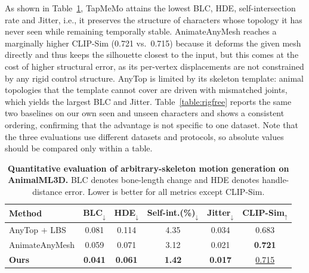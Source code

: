 \documentclass[lettersize,journal]{IEEEtran}
\newcommand{\blu}[1]{\texorpdfstring{{\leavevmode\color{blue}#1}}{#1}}
\begin{document}
\blu{As shown in Table~\ref{table:animalml3d}, TapMeMo attains the lowest BLC, HDE,
self-intersection rate and Jitter, i.e., it preserves the structure of characters whose
topology it has never seen while remaining temporally stable. AnimateAnyMesh reaches a
marginally higher CLIP-Sim (0.721 vs.\ 0.715) because it deforms the given mesh directly and
thus keeps the silhouette closest to the input, but this comes at the cost of higher
structural error, as its per-vertex displacements are not constrained by any rigid control
structure. AnyTop is limited by its skeleton template: animal topologies that the template
cannot cover are driven with mismatched joints, which yields the largest BLC and Jitter.
Table~\ref{table:rigfree} reports the same two baselines on our own seen and unseen
characters and shows a consistent ordering, confirming that the advantage is not specific to
one dataset. Note that the three evaluations use different datasets and protocols, so
absolute values should be compared only within a table.}
\begin{table}[t]
  \centering
  \setlength{\abovecaptionskip}{0.5mm}
  \renewcommand{\arraystretch}{1.3}
  \scriptsize
  \caption{\blu{\textbf{Quantitative evaluation of arbitrary-skeleton motion
  generation on AnimalML3D.} BLC denotes bone-length change and HDE denotes handle-distance
  error. Lower is better for all metrics except CLIP-Sim.}}
  \label{table:animalml3d}
  \setlength{\tabcolsep}{3pt}
  \begin{tabular*}{\linewidth}{@{\extracolsep{\fill}}lccccc@{}}
    \toprule[1.5pt]
    \blu{\textbf{Method}} & \blu{\textbf{BLC}$_{\downarrow}$} & \blu{\textbf{HDE}$_{\downarrow}$}
    & \blu{\textbf{Self-int.}(\%)$_{\downarrow}$} & \blu{\textbf{Jitter}$_{\downarrow}$}
    & \blu{\textbf{CLIP-Sim}$_{\uparrow}$} \\
    \midrule[0.5pt]
    \blu{AnyTop $+$ LBS} & \blu{0.081} & \blu{0.114} & \blu{4.35} & \blu{0.034} & \blu{0.683} \\
    \blu{AnimateAnyMesh} & \blu{0.059} & \blu{0.071} & \blu{3.12} & \blu{0.021} & \blu{\textbf{0.721}} \\
    \midrule[0.5pt]
    \blu{\textbf{Ours}}  & \blu{\textbf{0.041}} & \blu{\textbf{0.061}} & \blu{\textbf{1.42}} & \blu{\textbf{0.017}} & \blu{\underline{0.715}} \\
    \bottomrule[1.5pt]
  \end{tabular*}
\end{table}
\end{document}
